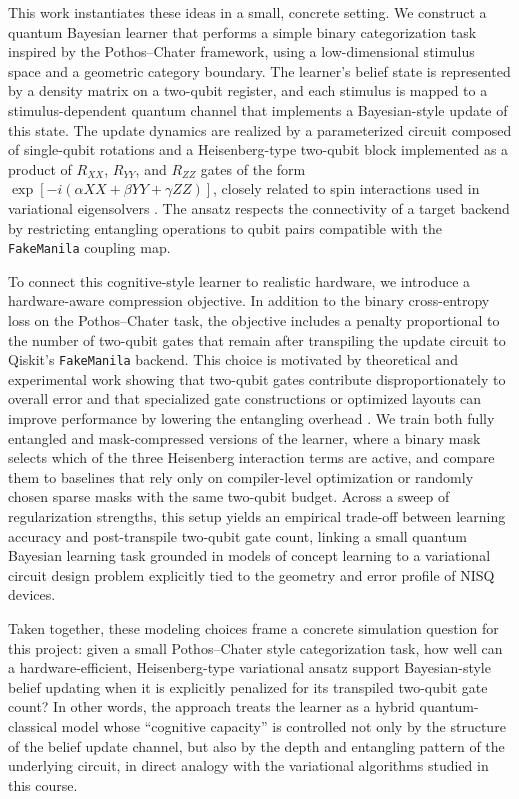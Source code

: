\documentclass[conference]{IEEEtran}
\begin{document}
This work instantiates these ideas in a small, concrete setting. We construct a quantum Bayesian learner that performs a simple binary categorization task inspired by the Pothos--Chater framework, using a low-dimensional stimulus space and a geometric category boundary. The learner’s belief state is represented by a density matrix on a two-qubit register, and each stimulus is mapped to a stimulus-dependent quantum channel that implements a Bayesian-style update of this state. The update dynamics are realized by a parameterized circuit composed of single-qubit rotations and a Heisenberg-type two-qubit block implemented as a product of \(R_{XX}\), \(R_{YY}\), and \(R_{ZZ}\) gates of the form
\(\exp[-i(\alpha X X + \beta Y Y + \gamma Z Z)]\), closely related to spin interactions used in variational eigensolvers \cite{b4,b17}. The ansatz respects the connectivity of a target backend by restricting entangling operations to qubit pairs compatible with the \texttt{FakeManila} coupling map.

To connect this cognitive-style learner to realistic hardware, we introduce a hardware-aware compression objective. In addition to the binary cross-entropy loss on the Pothos--Chater task, the objective includes a penalty proportional to the number of two-qubit gates that remain after transpiling the update circuit to Qiskit’s \texttt{FakeManila} backend. This choice is motivated by theoretical and experimental work showing that two-qubit gates contribute disproportionately to overall error and that specialized gate constructions or optimized layouts can improve performance by lowering the entangling overhead \cite{b7,b10}. We train both fully entangled and mask-compressed versions of the learner, where a binary mask selects which of the three Heisenberg interaction terms are active, and compare them to baselines that rely only on compiler-level optimization or randomly chosen sparse masks with the same two-qubit budget. Across a sweep of regularization strengths, this setup yields an empirical trade-off between learning accuracy and post-transpile two-qubit gate count, linking a small quantum Bayesian learning task grounded in models of concept learning to a variational circuit design problem explicitly tied to the geometry and error profile of NISQ devices.

Taken together, these modeling choices frame a concrete simulation question for this project: given a small Pothos--Chater style categorization task, how well can a hardware-efficient, Heisenberg-type variational ansatz support Bayesian-style belief updating when it is explicitly penalized for its transpiled two-qubit gate count? In other words, the approach treats the learner as a hybrid quantum-classical model whose ``cognitive capacity'' is controlled not only by the structure of the belief update channel, but also by the depth and entangling pattern of the underlying circuit, in direct analogy with the variational algorithms studied in this course.
\end{document}

